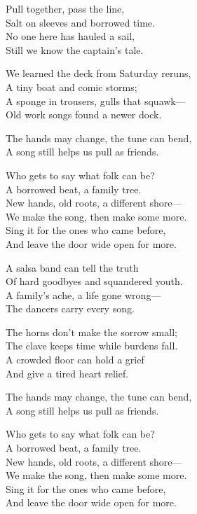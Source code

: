 \begin{lyrics}
Pull together, pass the line,\\
Salt on sleeves and borrowed time.\\
No one here has hauled a sail,\\
Still we know the captain’s tale.

We learned the deck from Saturday reruns,\\
A tiny boat and comic storms;\\
A sponge in trousers, gulls that squawk—\\
Old work songs found a newer dock.

The hands may change, the tune can bend,\\
A song still helps us pull as friends.

Who gets to say what folk can be?\\
A borrowed beat, a family tree.\\
New hands, old roots, a different shore—\\
We make the song, then make some more.\\
Sing it for the ones who came before,\\
And leave the door wide open for more.

A salsa band can tell the truth\\
Of hard goodbyes and squandered youth.\\
A family’s ache, a life gone wrong—\\
The dancers carry every song.

The horns don’t make the sorrow small;\\
The clave keeps time while burdens fall.\\
A crowded floor can hold a grief\\
And give a tired heart relief.

The hands may change, the tune can bend,\\
A song still helps us pull as friends.

Who gets to say what folk can be?\\
A borrowed beat, a family tree.\\
New hands, old roots, a different shore—\\
We make the song, then make some more.\\
Sing it for the ones who came before,\\
And leave the door wide open for more.


\end{lyrics}
